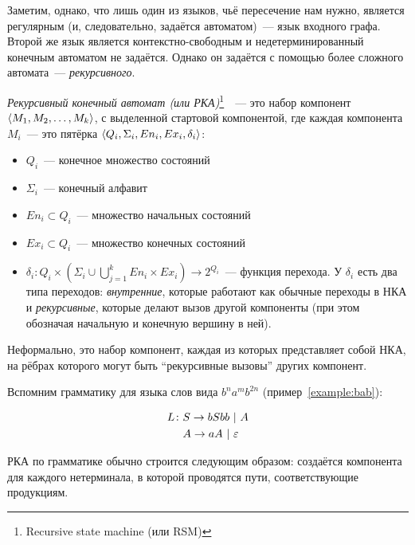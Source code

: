 Заметим, однако, что лишь один из языков, чьё пересечение нам нужно, является регулярным (и, следовательно, задаётся автоматом)~--- язык входного графа. Второй же язык является контекстно-свободным и недетерминированный конечным автоматом не задаётся. Однако он задаётся с помощью более сложного автомата~--- \textit{рекурсивного}. 

\begin{definition}
  \textit{Рекурсивный конечный автомат (или РКА)}\footnote{Recursive state machine (или RSM)}~\cite{Alur05}~--- это набор компонент $\langle M_1, M_2, \dots, M_k \rangle$, с выделенной стартовой компонентой, где каждая компонента $M_i$~--- это пятёрка $\langle Q_i, \Sigma_i, En_i, Ex_i, \delta_i \rangle$:
      \vspace{-\topsep}
      \begin{itemize}
        \setlength\itemsep{-0.1em}
        \item $Q_i$~--- конечное множество состояний
        \item $\Sigma_i$~--- конечный алфавит
        \item $En_i \subset Q_i$~--- множество начальных состояний
        \item $Ex_i \subset Q_i$~--- множество конечных состояний
        \item $\delta_i \colon Q_i \times (\Sigma_i \cup \bigcup\limits_{j = 1}^k En_i \times Ex_i ) \to 2^{Q_i}$~--- функция перехода. У $\delta_i$ есть два типа переходов: \textit{внутренние}, которые работают как обычные переходы в НКА и \textit{рекурсивные}, которые делают вызов другой компоненты (при этом обозначая начальную и конечную вершину в ней).
      \end{itemize}

  Неформально, это набор компонент, каждая из которых представляет собой НКА, на рёбрах которого могут быть ``рекурсивные вызовы'' других компонент.

\end{definition}

\begin{example}
  Вспомним грамматику для языка слов вида $b^n a^m b^{2n}$ (пример~\ref{example:bab}):

  \begin{align*}
    L \colon &S \rightarrow b S bb ~|~ A \\
    &A \rightarrow aA ~|~ \varepsilon
  \end{align*}

  РКА по грамматике обычно строится следующим образом: создаётся компонента для каждого нетерминала, в которой проводятся пути, соответствующие продукциям.

\end{example}

